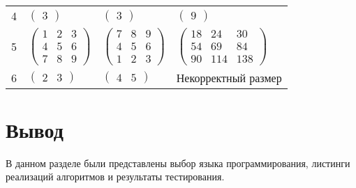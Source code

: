 \begin{table}[H]
\begin{center}
\begin{tabular}{l|l|l|l}
			\vspace{2mm}
			4 & $\begin{pmatrix}
				3
			\end{pmatrix}$ &
			$\begin{pmatrix}
				3
			\end{pmatrix}$ &
			$\begin{pmatrix}
				9
			\end{pmatrix}$ \\
			\vspace{2mm}
			\vspace{2mm}
			5 & $\begin{pmatrix}
				1 & 2 & 3\\
				4 & 5 & 6\\
				7 & 8 & 9
			\end{pmatrix}$ &
			$\begin{pmatrix}
				7 & 8 & 9\\
				4 & 5 & 6\\
				1 & 2 & 3
			\end{pmatrix}$ &
			$\begin{pmatrix}
				18 & 24 & 30\\
				54 & 69 & 84\\
				90 & 114 & 138
			\end{pmatrix}$\\
			\vspace{2mm}
			\vspace{2mm}
			6 & $\begin{pmatrix}
				2 & 3
			\end{pmatrix}$ &
			$\begin{pmatrix}
				4 & 5
			\end{pmatrix}$ &
			Некорректный размер\\
		\end{tabular}
	\end{center}
\end{table}

\section{Вывод}

В данном разделе были представлены выбор языка программирования, листинги реализаций алгоритмов и результаты тестирования.